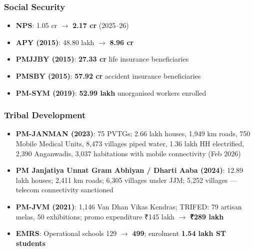 \subsubsection*{Social Security}
\begin{itemize}
  \item \textbf{NPS}: 1.05 cr $\rightarrow$ \textbf{2.17 cr} (2025--26)
  \item \textbf{APY (2015)}: 48.80 lakh $\rightarrow$ \textbf{8.96 cr}
  \item \textbf{PMJJBY (2015)}: \textbf{27.33 cr} life insurance beneficiaries
  \item \textbf{PMSBY (2015)}: \textbf{57.92 cr} accident insurance beneficiaries
  \item \textbf{PM-SYM (2019)}: \textbf{52.99 lakh} unorganised workers enrolled
\end{itemize}

\subsubsection*{Tribal Development}
\begin{itemize}
  \item \textbf{PM-JANMAN (2023)}: 75 PVTGs; 2.66 lakh houses, 1,949 km roads, 750 Mobile Medical Units, 8,473 villages piped water, 1.36 lakh HH electrified, 2,390 Anganwadis, 3,037 habitations with mobile connectivity (Feb 2026)
  \item \textbf{PM Janjatiya Unnat Gram Abhiyan / Dharti Aaba (2024)}: 12.89 lakh houses; 2,411 km roads; 6,305 villages under JJM; 5,252 villages --- telecom connectivity sanctioned
  \item \textbf{PM-JVM (2021)}: 1,146 Van Dhan Vikas Kendras; TRIFED: 79 artisan melas, 50 exhibitions; promo expenditure ₹145 lakh $\rightarrow$ \textbf{₹289 lakh}
  \item \textbf{EMRS}: Operational schools 129 $\rightarrow$ \textbf{499}; enrolment \textbf{1.54 lakh ST students}
\end{itemize}



\clearpage